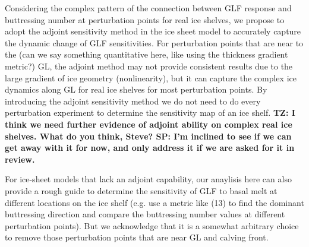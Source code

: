 \documentclass[review,oneside]{igs}
\begin{document}
Considering the complex pattern of the connection between GLF response and buttressing number at perturbation points for real ice shelves, we propose to adopt the adjoint sensitivity method in the ice sheet model to accurately capture the dynamic change of GLF sensitivities. For perturbation points that are near to the (can we say something quantitative here, like using the thickness gradient metric?) GL, the adjoint method may not provide consistent results due to the large gradient of ice geometry (nonlinearity), but it can capture the complex ice dynamics along GL for real ice shelves for most perturbation points. By introducing the adjoint sensitivity method we do not need to do every perturbation experiment to determine the sensitivity map of an ice shelf. \textbf{TZ: I think we need further evidence of adjoint ability on complex real ice shelves. What do you think, Steve? SP: I'm inclined to see if we can get away with it for now, and only address it if we are asked for it in review.}

For ice-sheet models that lack an adjoint capability, our anaylisis here can also provide a rough guide to determine the sensitivity of GLF to basal melt at different locations on the ice shelf (e.g. use a metric like (13) to find the dominant buttressing direction and compare the buttressing number values at different perturbation points). But we acknowledge that it is a somewhat arbitrary choice to remove those perturbation points that are near GL and calving front.


\end{document}
